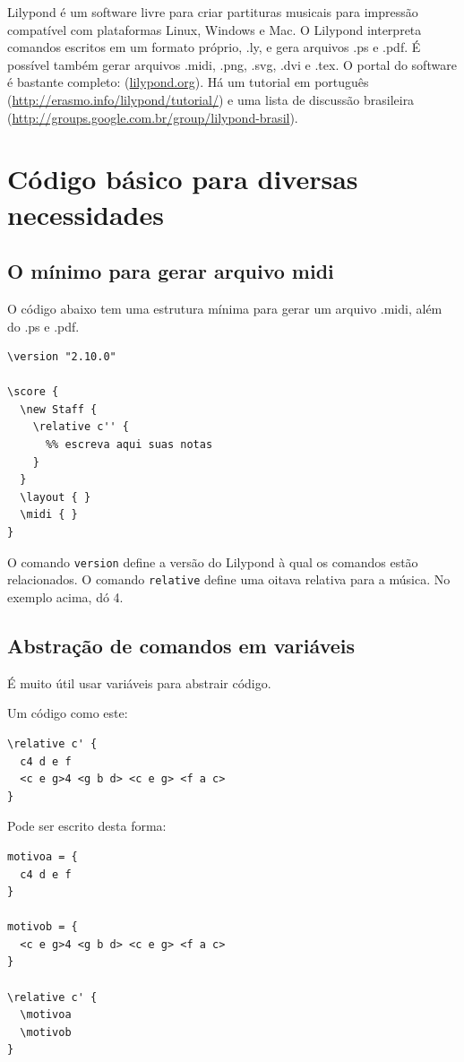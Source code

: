 \documentclass[12pt,brazil]{book}
\begin{document}
Lilypond é um software livre para criar partituras musicais para
impressão compatível com plataformas Linux, Windows e Mac. O Lilypond
interpreta comandos escritos em um formato próprio, .ly, e gera
arquivos .ps e .pdf. É possível também gerar arquivos .midi, .png,
.svg, .dvi e .tex. O portal do software é bastante completo:
(\url{lilypond.org}). Há um tutorial em português
(\url{http://erasmo.info/lilypond/tutorial/}) e uma lista de discussão
brasileira (\url{http://groups.google.com.br/group/lilypond-brasil}).


\section{Código básico para diversas necessidades}
\label{sec:codigo-basico-para}

\subsection{O mínimo para gerar arquivo midi}
\label{sec:o-minimo-para}

O código abaixo tem uma estrutura mínima para gerar um arquivo .midi,
além do .ps e .pdf.

\begin{verbatim}
\version "2.10.0"

\score {
  \new Staff {
    \relative c'' {
      %% escreva aqui suas notas
    }
  }
  \layout { }
  \midi { }
}
\end{verbatim}

O comando \texttt{version} define a versão do Lilypond à qual os
comandos estão relacionados. O comando \texttt{relative} define uma
oitava relativa para a música. No exemplo acima, dó 4.

\subsection{Abstração de comandos em variáveis}
\label{sec:abstr-de-comand}

É muito útil usar variáveis para abstrair código.

Um código como este:

\begin{verbatim}
\relative c' {
  c4 d e f
  <c e g>4 <g b d> <c e g> <f a c>
}
\end{verbatim}

Pode ser escrito desta forma:

\begin{verbatim}
motivoa = {
  c4 d e f
}

motivob = {
  <c e g>4 <g b d> <c e g> <f a c>
}

\relative c' {
  \motivoa
  \motivob
}
\end{verbatim}
\end{document}
